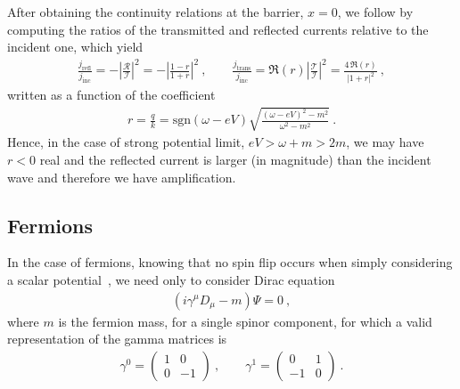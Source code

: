 After obtaining the continuity relations at the barrier, $x=0$, we follow by computing the ratios of the transmitted and reflected currents relative to the incident one, which yield
\begin{align}
    \frac{j_\mathrm{refl}}{j_\mathrm{inc}} = - \left|\frac{\mathcal{R}}{\mathcal{I}}\right|^2 = -\left|\frac{1-r}{1+r}\right|^2  ~, \qquad \frac{j_\mathrm{trans}}{j_\mathrm{inc}} = \Re(r) \left|\frac{\mathcal{T}}{\mathcal{I}}\right|^2 = \frac{4\, \Re(r)}{|1+r|^2} ~,
    \label{eq:KGcurrents}
\end{align}
written as a function of the coefficient 
\begin{align}
    r = \frac{q}{k} = \mathrm{sgn}(\omega - e V)  \sqrt{\frac{(\omega - e V)^2 - m^2}{\omega^2 - m^2}} ~.
    \label{eq:KGr}
\end{align}
Hence, in the case of strong potential limit, $e V > \omega + m > 2 m$, we may have $r<0$ real and the reflected current is larger (in magnitude) than the incident wave and therefore we have amplification.

\subsection{Fermions}

In the case of fermions, knowing that no spin flip occurs when simply considering a scalar potential~\cite{Itzykson2012}, we need only to consider Dirac equation
\begin{align}
    ( i \gamma^\mu D_\mu - m ) \Psi = 0 ~,
    \label{eq:Dirac}
\end{align}
where $m$ is the fermion mass, for a single spinor component, for which a valid representation of the gamma matrices is
\begin{align}
    \gamma^0 = \left(\begin{array}{cr} 1 & 0 \\  0 & -1 \end{array}\right) ~,\qquad 
    \gamma^1 = \left(\begin{array}{cr} 0 & 1 \\ -1 &  0 \end{array}\right) ~.
    \label{eq:Gamma1+1}
\end{align}

